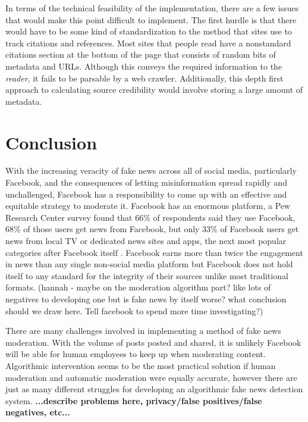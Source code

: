 \documentclass[12pt]{article}
\begin{document}
In terms of the technical feasibility of the implementation, there are a few issues that would make this point difficult to implement. The first hurdle is that there would have to be some kind of standardization to the method that sites use to track citations and references. Most sites that people read have a nonstandard citations section at the bottom of the page that consists of random bits of metadata and URLs. Although this conveys the required information to the \textit{reader}, it fails to be parsable by a web crawler. Additionally, this depth first approach to calculating source credibility would involve storing a large amount of metadata.

\section{Conclusion}

With the increasing veracity of fake news across all of social media, particularly Facebook, and the consequences of letting misinformation spread rapidly and unchallenged, Facebook has a responsibility to come up with an effective and equitable strategy to moderate it. Facebook has an enormous platform, a Pew Research Center survey found that 66\% of respondents said they use Facebook, 68\% of those users get news from Facebook, but only 33\% of Facebook users get news from local TV or dedicated news sites and apps, the next most popular categories after Facebook itself \citep{pew_news}. Facebook earns more than twice the engagement in news than any single non-social media platform but Facebook does not hold itself to any standard for the integrity of their sources unlike most traditional formats. (hannah - maybe on the moderation algorithm part? like lots of negatives to developing one but is fake news by itself worse? what conclusion should we draw here. Tell facebook to spend more time investigating?)

There are many challenges involved in implementing a method of fake news moderation. With the volume of posts posted and shared, it is unlikely Facebook will be able for human employees to keep up when moderating content. Algorithmic intervention seems to be the most practical solution if human moderation and automatic moderation were equally accurate, however there are just as many different struggles for developing an algorithmic fake news detection system. \textbf{...describe problems here, privacy/false positives/false negatives, etc...}
\end{document}
